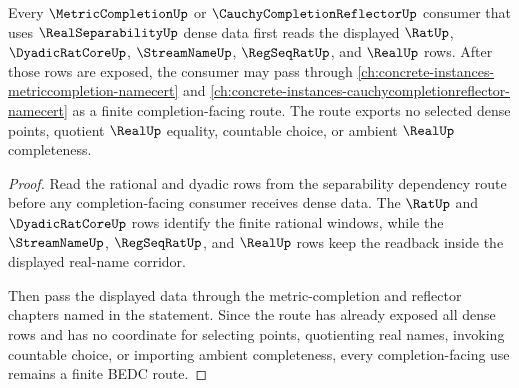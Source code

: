 \begin{proposition}
\label{prop:real-separability-metric-completion-reverse-route}
Every $\MetricCompletionUp$ or $\CauchyCompletionReflectorUp$ consumer that uses $\RealSeparabilityUp$ dense data first reads the displayed $\RatUp$, $\DyadicRatCoreUp$, $\StreamNameUp$, $\RegSeqRatUp$, and $\RealUp$ rows. After those rows are exposed, the consumer may pass through \autoref{ch:concrete-instances-metriccompletion-namecert} and \autoref{ch:concrete-instances-cauchycompletionreflector-namecert} as a finite completion-facing route. The route exports no selected dense points, quotient $\RealUp$ equality, countable choice, or ambient $\RealUp$ completeness.
\end{proposition}
\begin{proof}
Read the rational and dyadic rows from the separability dependency route before any completion-facing consumer receives dense data. The $\RatUp$ and $\DyadicRatCoreUp$ rows identify the finite rational windows, while the $\StreamNameUp$, $\RegSeqRatUp$, and $\RealUp$ rows keep the readback inside the displayed real-name corridor.

Then pass the displayed data through the metric-completion and reflector chapters named in the statement. Since the route has already exposed all dense rows and has no coordinate for selecting points, quotienting real names, invoking countable choice, or importing ambient completeness, every completion-facing use remains a finite BEDC route.
\end{proof}
